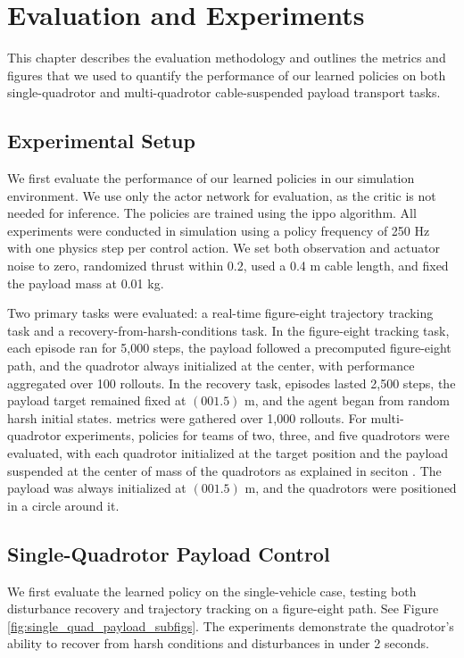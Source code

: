 \chapter{Evaluation and Experiments}

This chapter describes the evaluation methodology and outlines the metrics and figures that we used to quantify the performance of our learned policies on both single-quadrotor and multi-quadrotor cable-suspended payload transport tasks.

\section{Experimental Setup}
We first evaluate the performance of our learned policies in our simulation environment. We use only the actor network for evaluation, as the critic is not needed for inference. The policies are trained using the \gls{ippo} algorithm.
All experiments were conducted in simulation using a policy frequency of 250 Hz with one physics step per control action. We set both observation and actuator noise to zero, randomized thrust within $0.2$, used a 0.4 m cable length, and fixed the payload mass at 0.01 kg. 

Two primary tasks were evaluated: a real-time figure-eight trajectory tracking task and a recovery-from-harsh-conditions task. In the figure-eight tracking task, each episode ran for 5,000 steps, the payload followed a precomputed figure-eight path, and the quadrotor always initialized at the center, with performance aggregated over 100 rollouts. In the recovery task, episodes lasted 2,500 steps, the payload target remained fixed at $(0 0 1.5)$ m, and the agent began from random harsh initial states. metrics were gathered over 1,000 rollouts. For multi-quadrotor experiments, policies for teams of two, three, and five quadrotors were evaluated, with each quadrotor initialized at the target position and the payload suspended at the center of mass of the quadrotors as explained in seciton . The payload was always initialized at $(0 0 1.5)$ m, and the quadrotors were positioned in a circle around it.

\section{Single-Quadrotor Payload Control}
We first evaluate the learned policy on the single-vehicle case, testing both disturbance recovery and trajectory tracking on a figure-eight path. See Figure \ref{fig:single_quad_payload_subfigs}.
The experiments demonstrate the quadrotor's ability to recover from harsh conditions and disturbances in under 2 seconds. 



